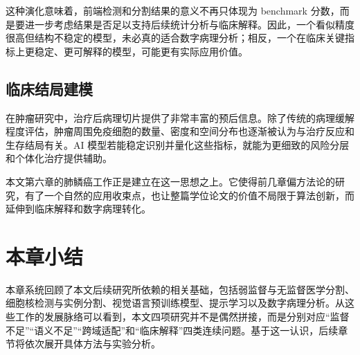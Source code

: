 这种演化意味着，前端检测和分割结果的意义不再只体现为 benchmark 分数，而是要进一步考虑结果是否足以支持后续统计分析与临床解释。因此，一个看似精度很高但结构不稳定的模型，未必真的适合数字病理分析；相反，一个在临床关键指标上更稳定、更可解释的模型，可能更有实际应用价值。

\subsection{临床结局建模}
在肿瘤研究中，治疗后病理切片提供了非常丰富的预后信息。除了传统的病理缓解程度评估，肿瘤周围免疫细胞的数量、密度和空间分布也逐渐被认为与治疗反应和生存结局有关。AI 模型若能稳定识别并量化这些指标，就能为更细致的风险分层和个体化治疗提供辅助。

本文第六章的肺鳞癌工作正是建立在这一思想之上。它使得前几章偏方法论的研究，有了一个自然的应用收束点，也让整篇学位论文的价值不局限于算法创新，而延伸到临床解释和数字病理转化。

\section{本章小结}
本章系统回顾了本文后续研究所依赖的相关基础，包括弱监督与无监督医学分割、细胞核检测与实例分割、视觉语言预训练模型、提示学习以及数字病理分析。从这些工作的发展脉络可以看到，本文四项研究并不是偶然拼接，而是分别对应“监督不足”“语义不足”“跨域适配”和“临床解释”四类连续问题。基于这一认识，后续章节将依次展开具体方法与实验分析。
